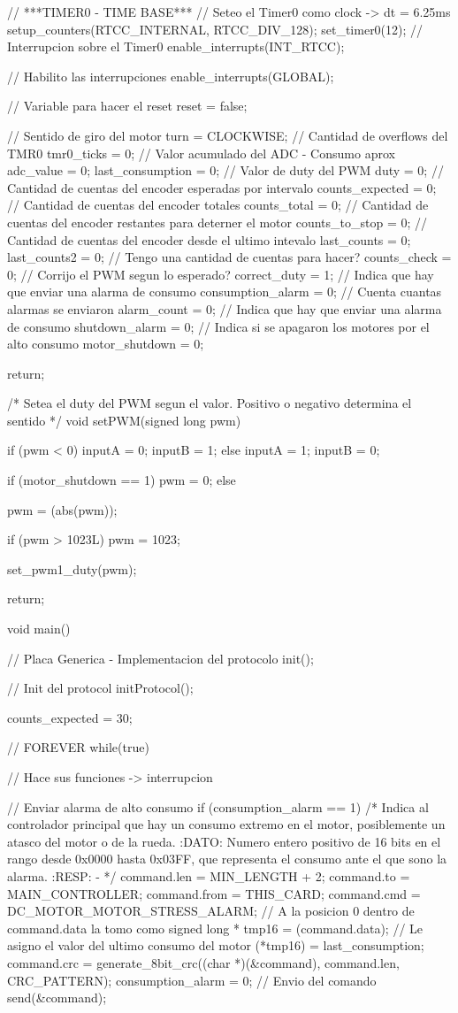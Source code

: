 {\begin{verbatimtab}
{	// ***TIMER0 - TIME BASE***
	// Seteo el Timer0 como clock -> dt = 6.25ms
	setup_counters(RTCC_INTERNAL, RTCC_DIV_128);
	set_timer0(12);
	// Interrupcion sobre el Timer0
	enable_interrupts(INT_RTCC);

	// Habilito las interrupciones
	enable_interrupts(GLOBAL);
	
	// Variable para hacer el reset
	reset = false;

	// Sentido de giro del motor
	turn = CLOCKWISE;
	// Cantidad de overflows del TMR0
	tmr0_ticks = 0;
	// Valor acumulado del ADC - Consumo aprox
	adc_value = 0;
	last_consumption = 0;
	// Valor de duty del PWM
	duty = 0;
	// Cantidad de cuentas del encoder esperadas por intervalo
	counts_expected = 0;
	// Cantidad de cuentas del encoder totales
	counts_total = 0;
	// Cantidad de cuentas del encoder restantes para deterner el motor
	counts_to_stop = 0;
	// Cantidad de cuentas del encoder desde el ultimo intevalo
	last_counts = 0;
	last_counts2 = 0;
	// Tengo una cantidad de cuentas para hacer?
	counts_check = 0;
	// Corrijo el PWM segun lo esperado?
	correct_duty = 1;
	// Indica que hay que enviar una alarma de consumo
	consumption_alarm = 0;
	// Cuenta cuantas alarmas se enviaron
	alarm_count = 0;
	// Indica que hay que enviar una alarma de consumo
	shutdown_alarm = 0;
	// Indica si se apagaron los motores por el alto consumo
	motor_shutdown = 0;

	return;	
}	

/* Setea el duty del PWM segun el valor. Positivo o negativo determina el sentido */
void setPWM(signed long pwm)
{
	if (pwm < 0)
	{
		inputA = 0;
		inputB = 1;
	} else {
		inputA = 1;
		inputB = 0;
	}
	
	if (motor_shutdown == 1)
	{
		pwm = 0;
	} else {
		pwm = (abs(pwm));
		
		if (pwm > 1023L)
			pwm = 1023;
	}

	set_pwm1_duty(pwm);
	
	return;
}

void main()
{
	// Placa Generica - Implementacion del protocolo
	init();

	// Init del protocol
	initProtocol();

counts_expected = 30;

	// FOREVER
	while(true)
	{
		// Hace sus funciones -> interrupcion
	
		// Enviar alarma de alto consumo
		if (consumption_alarm == 1)
		{
			/* Indica al controlador principal que hay un consumo extremo en el motor,
			posiblemente un atasco del motor o de la rueda.
			:DATO:
			Numero entero positivo de 16 bits en el rango desde 0x0000 hasta
			0x03FF, que representa el consumo ante el que sono la alarma.
			:RESP:
			-
			*/
			command.len = MIN_LENGTH + 2;
			command.to = MAIN_CONTROLLER;
			command.from = THIS_CARD;
			command.cmd = DC_MOTOR_MOTOR_STRESS_ALARM;
			// A la posicion 0 dentro de command.data la tomo como signed long *
			tmp16 = (command.data);
			// Le asigno el valor del ultimo consumo del motor
			(*tmp16) = last_consumption;
			command.crc = generate_8bit_crc((char *)(&command), command.len, CRC_PATTERN);
			consumption_alarm = 0;
			// Envio del comando
			send(&command);
		}
		
}}
\end{verbatimtab}}
